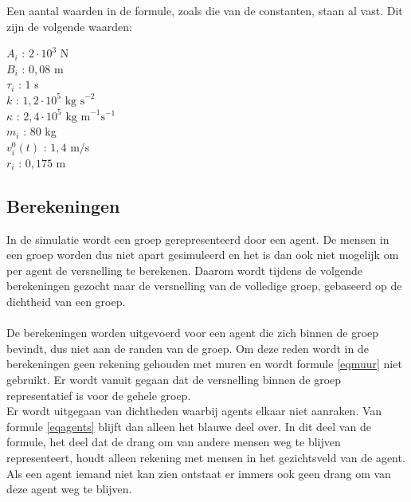\documentclass[12pt, letterpaper]{article}
\begin{document}
\noindent Een aantal waarden in de formule, zoals die van de constanten, staan al vast. Dit zijn de volgende waarden:
\begin{center}
    $A_i$ : $2 \cdot 10^3$ N \\
    $B_i$ : $0,08$ m \\
    $\tau_i$ : $1$ s \\
    $k$ : $1,2 \cdot 10^5 \text{ kg s}^{-2}$ \\
    $\kappa$ : $2,4 \cdot 10^5 \text{ kg m}^{-1}\text{s}^{-1}$ \\
    $m_i$ : $80$ kg\\
    $v_i^{0}(t)$ : $1,4$ m/s \\
    $r_i$ : $0,175$ m
\end{center}
\subsection{Berekeningen}
In de simulatie wordt een groep gerepresenteerd door een agent. De mensen in een groep worden dus niet apart gesimuleerd en het is dan ook niet mogelijk om per agent de versnelling te berekenen. Daarom wordt tijdens de volgende berekeningen gezocht naar de versnelling van de volledige groep, gebaseerd op de dichtheid van een groep.
\\ \\
De berekeningen worden uitgevoerd voor een agent die zich binnen de groep bevindt, dus niet aan de randen van de groep. Om deze reden wordt in de berekeningen geen rekening gehouden met muren en wordt formule \ref{eqmuur} niet gebruikt. Er wordt vanuit gegaan dat de versnelling binnen de groep representatief is voor de gehele groep.\\
Er wordt uitgegaan van dichtheden waarbij agents elkaar niet aanraken. Van formule \ref{eqagents} blijft dan alleen het blauwe deel over. In dit deel van de formule, het deel dat de drang om van andere mensen weg te blijven representeert, houdt alleen rekening met mensen in het gezichtsveld van de agent. Als een agent iemand niet kan zien ontstaat er immers ook geen drang om van deze agent weg te blijven.
\end{document}
